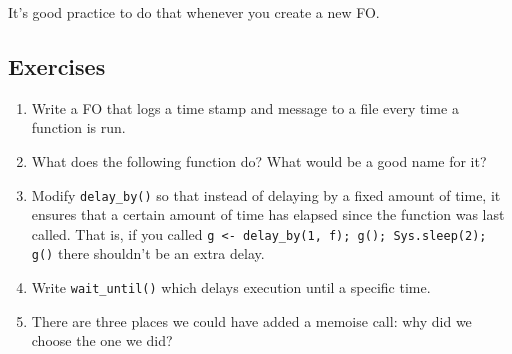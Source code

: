 It's good practice to do that whenever you create a new FO.

\subsection{Exercises}

\begin{enumerate}
\def\labelenumi{\arabic{enumi}.}
\item
  Write a FO that logs a time stamp and message to a file every time a
  function is run.
\item
  What does the following function do? What would be a good name for it?

\begin{Shaded}
\begin{Highlighting}[]
\StringTok{ }
  \StringTok{ }
      \StringTok{ }
    \NormalTok{\}}
  \NormalTok{\}}
\NormalTok{\}}
\StringTok{ }
\NormalTok{(}\NormalTok{)}
\NormalTok{(}\NormalTok{)}
\end{Highlighting}
\end{Shaded}
\item
  Modify \texttt{delay\_by()} so that instead of delaying by a fixed
  amount of time, it ensures that a certain amount of time has elapsed
  since the function was last called. That is, if you called
  \texttt{g \textless{}- delay\_by(1, f); g(); Sys.sleep(2); g()} there
  shouldn't be an extra delay.
\item
  Write \texttt{wait\_until()} which delays execution until a specific
  time.
\item
  There are three places we could have added a memoise call: why did we
  choose the one we did?


\end{enumerate}
